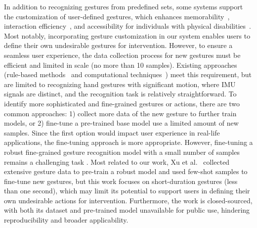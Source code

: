 In addition to recognizing gestures from predefined sets, some systems support the customization of user-defined gestures, which enhances memorability~\cite{nacenta_memorability_2013}, interaction efficiency~\cite{ouyang_bootstrapping_2012}, and accessibility for individuals with physical disabilities~\cite{anthony_analyzing_2013}. Most notably, incorporating gesture customization in our system enables users to define their own undesirable gestures for intervention.  
However, to ensure a seamless user experience, the data collection process for new gestures must be efficient and limited in scale (\eg no more than 10 samples). Existing approaches (\eg rule-based methods~\cite{avrahami_guided_2001,doring_gestural_2011} and computational techniques~\cite{lou_personalized_2017,anthony_lightweight_2010, mckenna_comparison_2004,ouyang_bootstrapping_2012}) meet this requirement, but are limited to recognizing hand gestures with significant motion, where IMU signals are distinct, and the recognition task is relatively straightforward. 
To identify more sophisticated and fine-grained gestures or actions, there are two common approaches: 1) collect more data of the new gesture to further train models, or 2) fine-tune a pre-trained base model use a limited amount of new samples. Since the first option would impact user experience in real-life applications, the fine-tuning approach is more appropriate. However, fine-tuning a robust fine-grained gesture recognition model with a small number of samples remains a challenging task \cite{stewart_online_2020,wu_one_2012,rahimian_few-shot_2021, xu2022enabling, rahimian2021fs,zou2024pregesnet}. Most related to our work, Xu et al.~\cite{xu2022enabling} collected extensive gesture data to pre-train a robust model and used few-shot samples to fine-tune new gestures, but this work focuses on short-duration gestures (less than one second), which may limit its potential to support users in defining their own undesirable actions for intervention. Furthermore, the work is closed-sourced, with both its dataset and pre-trained model unavailable for public use, hindering reproducibility and broader applicability.



